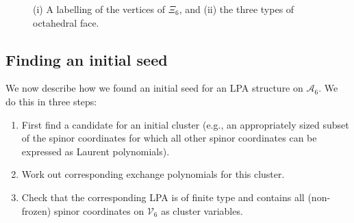 \documentclass[pdftex]{sigma}
\numberwithin{equation}{section}
\theoremstyle{definition}
\newcommand{\setupCayleynodes}{
 \draw[gray!30] (0,0) circle (1cm);
 \draw[gray!30] (0,0) circle (0.5176cm);
 \foreach \i in {0,...,11} {
 \node[gray!30] at ({cos(30*\i)},{sin(30*\i)}) {\tiny $\bullet$};
 \node[gray!30] at ({sqrt(2-sqrt(3))*cos(30*\i+15)},{sqrt(2-sqrt(3))*sin(30*\i+15)}) {\tiny $\bullet$};
 \node[gray!30] at (0,0) {\tiny $\bullet$};
 }

 \node[inner sep=-3pt] (a0) at ({cos( 0)},{sin( 0)}) {};
 \node[inner sep=-3pt] (a1) at ({cos( 30)},{sin( 30)}) {};
 \node[inner sep=-3pt] (a2) at ({cos( 60)},{sin( 60)}) {};
 \node[inner sep=-3pt] (a3) at ({cos( 90)},{sin( 90)}) {};
 \node[inner sep=-3pt] (a4) at ({cos(120)},{sin(120)}) {};
 \node[inner sep=-3pt] (a5) at ({cos(150)},{sin(150)}) {};
 \node[inner sep=-3pt] (a6) at ({cos(180)},{sin(180)}) {};
 \node[inner sep=-3pt] (a7) at ({cos(210)},{sin(210)}) {};
 \node[inner sep=-3pt] (a8) at ({cos(240)},{sin(240)}) {};
 \node[inner sep=-3pt] (a9) at ({cos(270)},{sin(270)}) {};
 \node[inner sep=-3pt] (a10) at ({cos(300)},{sin(300)}) {};
 \node[inner sep=-3pt] (a11) at ({cos(330)},{sin(330)}) {};

 \node[inner sep=-3pt] (b0) at ({cos( 0+15)*sqrt(2-sqrt(3))},{sin( 0+15)*sqrt(2-sqrt(3))}) {};
 \node[inner sep=-3pt] (b1) at ({cos( 30+15)*sqrt(2-sqrt(3))},{sin( 30+15)*sqrt(2-sqrt(3))}) {};
 \node[inner sep=-3pt] (b2) at ({cos( 60+15)*sqrt(2-sqrt(3))},{sin( 60+15)*sqrt(2-sqrt(3))}) {};
 \node[inner sep=-3pt] (b3) at ({cos( 90+15)*sqrt(2-sqrt(3))},{sin( 90+15)*sqrt(2-sqrt(3))}) {};
 \node[inner sep=-3pt] (b4) at ({cos(120+15)*sqrt(2-sqrt(3))},{sin(120+15)*sqrt(2-sqrt(3))}) {};
 \node[inner sep=-3pt] (b5) at ({cos(150+15)*sqrt(2-sqrt(3))},{sin(150+15)*sqrt(2-sqrt(3))}) {};
 \node[inner sep=-3pt] (b6) at ({cos(180+15)*sqrt(2-sqrt(3))},{sin(180+15)*sqrt(2-sqrt(3))}) {};
 \node[inner sep=-3pt] (b7) at ({cos(210+15)*sqrt(2-sqrt(3))},{sin(210+15)*sqrt(2-sqrt(3))}) {};
 \node[inner sep=-3pt] (b8) at ({cos(240+15)*sqrt(2-sqrt(3))},{sin(240+15)*sqrt(2-sqrt(3))}) {};
 \node[inner sep=-3pt] (b9) at ({cos(270+15)*sqrt(2-sqrt(3))},{sin(270+15)*sqrt(2-sqrt(3))}) {};
 \node[inner sep=-3pt] (b10) at ({cos(300+15)*sqrt(2-sqrt(3))},{sin(300+15)*sqrt(2-sqrt(3))}) {};
 \node[inner sep=-3pt] (b11) at ({cos(330+15)*sqrt(2-sqrt(3))},{sin(330+15)*sqrt(2-sqrt(3))}) {};}
\begin{document}
\begin{figure}[ht!]
\caption{(i) A labelling of the vertices of $\Xi_6$, and (ii) the three types of octahedral face.}\label{fig!cayley-plane}
\end{figure}

\subsection{Finding an initial seed}

We now describe how we found an initial seed for an LPA structure on $\mathcal A_6$. We do this in three steps:
\begin{enumerate}\itemsep=0pt
\item[(1)] First find a candidate for an initial cluster (e.g., an appropriately sized subset of the spinor coordinates for which all other spinor coordinates can be expressed as Laurent polynomials).
\item[(2)] Work out corresponding exchange polynomials for this cluster.
\item[(3)] Check that the corresponding LPA is of finite type and contains all (non-frozen) spinor coordinates on $\mathcal V_6$ as cluster variables.
\end{enumerate}
\end{document}
